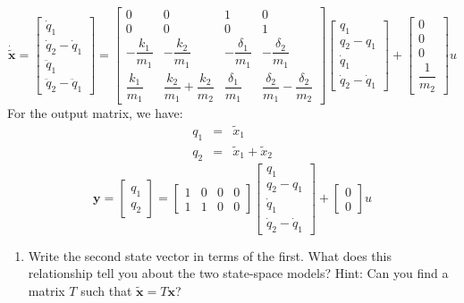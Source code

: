 \documentclass[11pt]{article}
\begin{document}
\[
\dot{\tilde{\mathbf{x}}}
=
\begin{bmatrix}
\dot{q}_1\\
\dot{q}_2-\dot{q}_1\\
\ddot{q}_1\\
\ddot{q}_2-\ddot{q}_1
\end{bmatrix}
=
\begin{bmatrix}
0 & 0 & 1 & 0\\
0 & 0 & 0 & 1\\
-\dfrac{k_1}{m_1}
&
-\dfrac{k_2}{m_1}
&
-\dfrac{\delta_1}{m_1}
&
-\dfrac{\delta_2}{m_1}
\\
\dfrac{k_1}{m_1}
&
\dfrac{k_2}{m_1}+\dfrac{k_2}{m_2}
&
\dfrac{\delta_1}{m_1}
&
\dfrac{\delta_2}{m_1}-\dfrac{\delta_2}{m_2}
\end{bmatrix}
\begin{bmatrix}
q_1\\
q_2-q_1\\
\dot{q}_1\\
\dot{q}_2-\dot{q}_1
\end{bmatrix}
+
\begin{bmatrix}
0\\
0\\
0\\
\dfrac{1}{m_2}
\end{bmatrix}
u
\]
For the output matrix, we have:
\begin{eqnarray*}
    q_1 &=& \tilde{x}_1\\
    q_2 &=& \tilde{x}_1 + \tilde{x}_2
\end{eqnarray*}
\[
\mathbf{y}
=
\begin{bmatrix}
q_1\\
q_2
\end{bmatrix}
=
\begin{bmatrix}
1 & 0 & 0 & 0\\
1 & 1 & 0 & 0
\end{bmatrix}
\begin{bmatrix}
q_1\\
q_2-q_1\\
\dot{q}_1\\
\dot{q}_2-\dot{q}_1
\end{bmatrix}
+
\begin{bmatrix}
0\\
0
\end{bmatrix}
u
\]
\begin{enumerate}
    \item[(c)] Write the second state vector in terms of the first. What does this relationship tell you about the two state-space models? Hint: Can you find a matrix $T$ such that $\tilde{\mathbf{x}}=T\mathbf{x}$?
\end{enumerate}
\end{document}
